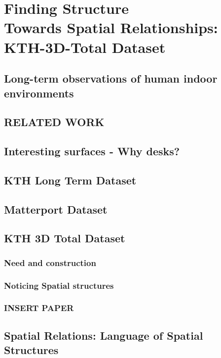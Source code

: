 \chapter[Finding Structure]{Finding Structure \\ {\Large Towards Spatial Relationships: KTH-3D-Total Dataset}}
\label{chap:FindingStructures}

\section{Long-term observations of human indoor environments}
\section{RELATED WORK}
\section{Interesting surfaces - Why desks?}
\section{KTH Long Term Dataset}
\section{Matterport Dataset}
\section{KTH 3D Total Dataset}
\subsection{Need and construction}
\subsection{Noticing Spatial structures}
\subsection{INSERT PAPER}
\section{Spatial Relations: Language of Spatial Structures}

